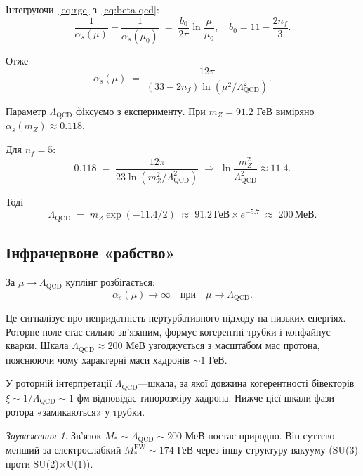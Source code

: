 \documentclass[11pt,a4paper]{article}
\theoremstyle{definition}
\theoremstyle{plain}
\theoremstyle{remark}
\newtheorem{remark}{Зауваження}[section]
\begin{document}
Інтегруючи~\eqref{eq:rge} з~\eqref{eq:beta-qcd}:
\begin{equation}
\frac{1}{\alpha_s(\mu)} - \frac{1}{\alpha_s(\mu_0)} \;=\; \frac{b_0}{2\pi}\ln\frac{\mu}{\mu_0},\quad b_0=11-\frac{2n_f}{3}.
\end{equation}

Отже
\begin{equation}
\alpha_s(\mu) \;=\; \frac{12\pi}{(33 - 2n_f)\ln(\mu^2/\Lambda_{\mathrm{QCD}}^2)}.
\label{eq:running-coupling}
\end{equation}

Параметр $\Lambda_{\mathrm{QCD}}$ фіксуємо з експерименту. При $m_Z=91{.}2$ ГеВ виміряно $\alpha_s(m_Z)\approx 0{.}118$.

Для $n_f=5$:
\begin{equation}
0{.}118 \;=\; \frac{12\pi}{23\ln(m_Z^2/\Lambda_{\mathrm{QCD}}^2)} \;\Rightarrow\; \ln\frac{m_Z^2}{\Lambda_{\mathrm{QCD}}^2} \approx 11{.}4.
\end{equation}

Тоді
\begin{equation}
\Lambda_{\mathrm{QCD}} \;=\; m_Z \exp(-11{.}4/2) \;\approx\; 91{.}2\,\text{ГеВ}\times e^{-5{.}7} \;\approx\; \boxed{200\,\text{МеВ}.}
\label{eq:lambda-qcd}
\end{equation}

\subsection{Інфрачервоне «рабство»}

За $\mu\to\Lambda_{\mathrm{QCD}}$ куплінг розбігається:
\begin{equation}
\alpha_s(\mu)\to\infty \quad \text{при}\quad \mu\to\Lambda_{\mathrm{QCD}}.
\end{equation}

Це сигналізує про непридатність пертурбативного підходу на низьких енергіях. Роторне поле стає сильно зв’язаним, формує когерентні трубки і конфайнує кварки. Шкала $\Lambda_{\mathrm{QCD}}\approx 200$ МеВ узгоджується з масштабом мас протона, пояснюючи чому характерні маси хадронів $\sim 1$ ГеВ.

У роторній інтерпретації $\Lambda_{\mathrm{QCD}}$—шкала, за якої довжина когерентності бівекторів $\xi\sim 1/\Lambda_{\mathrm{QCD}}\sim 1$ фм відповідає типорозміру хадрона. Нижче цієї шкали фази ротора «замикаються» у трубки.

\begin{remark}
Зв’язок $M_\ast\sim\Lambda_{\mathrm{QCD}}\sim 200$ МеВ постає природно. Він суттєво менший за електрослабкий $M_\ast^{\mathrm{EW}}\sim 174$ ГеВ через іншу структуру вакууму (SU(3) проти SU(2)$\times$U(1)).
\end{remark}
\end{document}
